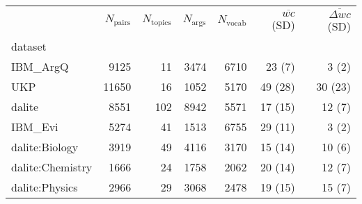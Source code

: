 \newlength{\digitlen}
\settowidth{\digitlen}{0}
\begin{tabular}{lrrrrrr}
\toprule
{} &  $N_{\mathrm{pairs}}$ &  $N_{\mathrm{topics}}$ &  $N_{\mathrm{args}}$  &  $N_{\mathrm{vocab}}$ & 
$\overline{wc}$ (SD) & 
$\overline{\Delta wc}$ (SD)\\
dataset          &          &           &         &        &              &                   \\
\midrule
IBM\_ArgQ         &     9125 &        11 &    3474 &   6710 &       23 (\hspace{\digitlen}7) &             3 (\hspace{\digitlen}2) \\
UKP              &    11650 &        16 &    1052 &   5170 &      49 (28) &           30 (23) \\
dalite           &     8551 &       102 &    8942 &   5571 &      17 (15) &            12 (\hspace{\digitlen}7) \\
IBM\_Evi          &     5274 &        41 &    1513 &   6755 &      29 (11) &             3 (\hspace{\digitlen}2) \\
dalite:Biology   &     3919 &        49 &    4116 &   3170 &      15 (14) &            10 (\hspace{\digitlen}6) \\
dalite:Chemistry &     1666 &        24 &    1758 &   2062 &      20 (14) &            12 (\hspace{\digitlen}7) \\
dalite:Physics   &     2966 &        29 &    3068 &   2478 &      19 (15) &            15 (\hspace{\digitlen}7) \\
\bottomrule
\end{tabular}
